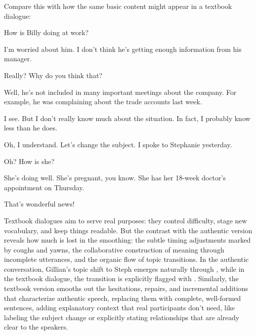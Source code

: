 Compare this with how the same basic content might appear in a textbook dialogue:

\ea
\begin{dialogue}
\item[Robert] How is Billy doing at work?

\item[Gillian] I'm worried about him. I don't think he's getting enough information from his manager.

\item[Robert] Really? Why do you think that?

\item[Gillian] Well, he's not included in many important meetings about the company. For example, he was complaining about the trade accounts last week.

\item[Robert] I see. But I don't really know much about the situation. In fact, I probably know less than he does.

\item[Gillian] Oh, I understand. Let's change the subject. I spoke to Stephanie yesterday.

\item[Robert] Oh? How is she?

\item[Gillian] She's doing well. She's pregnant, you know. She has her 18-week doctor's appointment on Thursday.

\item[Robert] That's wonderful news!
\end{dialogue}
\z
Textbook dialogues aim to serve real purposes: they control difficulty, stage new vocabulary, and keep things readable. But the contrast with the authentic version reveals how much is lost in the smoothing: the subtle timing adjustments marked by coughs and yawns, the collaborative construction of meaning through incomplete utterances, and the organic flow of topic transitions. In the authentic conversation, Gillian's topic shift to Steph emerges naturally through , while in the textbook dialogue, the transition is explicitly flagged with . Similarly, the textbook version smooths out the hesitations, repairs, and incremental additions that characterize authentic speech, replacing them with complete, well-formed sentences, adding explanatory context that real participants don't need, like labeling the subject change or explicitly stating relationships that are already clear to the speakers.


